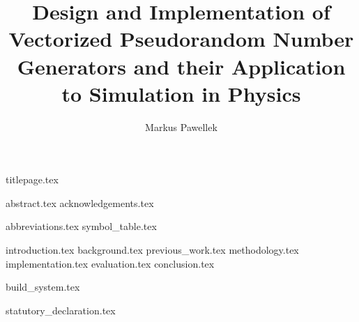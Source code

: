 \documentclass[fleqn,10pt,twoside]{stdglobal}
\title{Design and Implementation of Vectorized Pseudorandom Number Generators and their Application to Simulation in Physics}
\author{Markus Pawellek}
\let\oldpagenumbering\pagenumbering
\renewcommand*\pagenumbering[1]{\cleardoublepage\oldpagenumbering{#1}}
\begin{document}

  {titlepage.tex}

  {abstract.tex}
  {acknowledgements.tex}

  \tableofcontents
  \listoffigures
  {abbreviations.tex}
  {symbol_table.tex}

  {introduction.tex}
  {background.tex}
  {previous_work.tex}
  {methodology.tex}
  {implementation.tex}
  {evaluation.tex}
  {conclusion.tex}
  \nocite{*}
  \printbibheading[heading=bibintoc]
  \printbibliography[notkeyword={c++},heading=subbibliography,title={General}]
  \printbibliography[keyword={c++},heading=subbibliography,title={Programming}]

  \appendix
  {build_system.tex}

  {statutory_declaration.tex}
\end{document}
